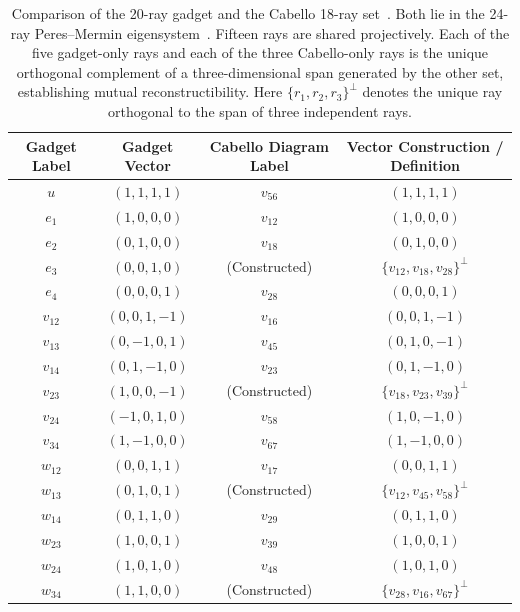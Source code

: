 \documentclass[%
  reprint,
  superscriptaddress,
  showpacs,
  showkeys,
  amsmath,amssymb,
  pra,
  longbibliography,
  floatfix,
  x11names
]{revtex4-2}
\newcommand{\rev}[1]{{\color{revisionblue}#1}}
\begin{document}
\begin{table}[ht]
\caption{\rev{Comparison of the 20-ray gadget and the Cabello 18-ray set~\cite{cabello-96,cabello:210401}.  Both lie in the 24-ray Peres--Mermin eigensystem~\cite{peres111,mermin90b,peres-91,pavicic-2004ksafq,svozil-2024-convert-pra-externalfigures}.  Fifteen rays are shared projectively.  Each of the five gadget-only rays and each of the three Cabello-only rays is the unique orthogonal complement of a three-dimensional span generated by the other set, establishing mutual reconstructibility.  Here $\{r_1,r_2,r_3\}^{\perp}$ denotes the unique ray orthogonal to the span of three independent rays.}}
\label{tab:vector-equivalence}
\begin{ruledtabular}
\begin{tabular}{cccc}
Gadget Label & Gadget Vector & Cabello Diagram Label & Vector Construction / Definition \\
\hline
$u$ & $(1,1,1,1)$ & $v_{56}$ & $(1,1,1,1)$ \\
$e_1$ & $(1,0,0,0)$ & $v_{12}$ & $(1,0,0,0)$ \\
$e_2$ & $(0,1,0,0)$ & $v_{18}$ & $(0,1,0,0)$ \\
$e_3$ & $(0,0,1,0)$ & (Constructed) & $\{v_{12}, v_{18}, v_{28}\}^\perp$ \\
$e_4$ & $(0,0,0,1)$ & $v_{28}$ & $(0,0,0,1)$ \\
\hline
$v_{12}$ & $(0,0,1,-1)$ & $v_{16}$ & $(0,0,1,-1)$ \\
$v_{13}$ & $(0,-1,0,1)$ & $v_{45}$ & $(0,1,0,-1)$ \\
$v_{14}$ & $(0,1,-1,0)$ & $v_{23}$ & $(0,1,-1,0)$ \\
$v_{23}$ & $(1,0,0,-1)$ & \rev{(Constructed)} & \rev{$\{v_{18},v_{23},v_{39}\}^\perp$} \\
$v_{24}$ & $(-1,0,1,0)$ & $v_{58}$ & $(1,0,-1,0)$ \\
$v_{34}$ & $(1,-1,0,0)$ & $v_{67}$ & $(1,-1,0,0)$ \\
\hline
$w_{12}$ & $(0,0,1,1)$ & $v_{17}$ & $(0,0,1,1)$ \\
$w_{13}$ & $(0,1,0,1)$ & \rev{(Constructed)} & \rev{$\{v_{12},v_{45},v_{58}\}^\perp$} \\
$w_{14}$ & $(0,1,1,0)$ & $v_{29}$ & $(0,1,1,0)$ \\
$w_{23}$ & $(1,0,0,1)$ & $v_{39}$ & $(1,0,0,1)$ \\
$w_{24}$ & $(1,0,1,0)$ & $v_{48}$ & $(1,0,1,0)$ \\
$w_{34}$ & $(1,1,0,0)$ & \rev{(Constructed)} & \rev{$\{v_{28},v_{16},v_{67}\}^\perp$} \\

\end{tabular}
\end{ruledtabular}
\end{table}
\end{document}
